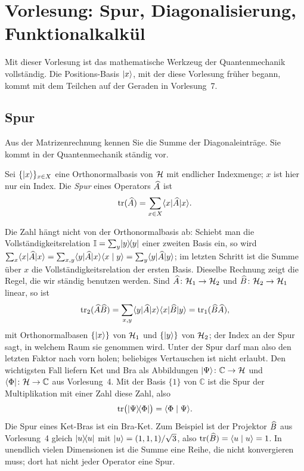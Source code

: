 
\section{Vorlesung: Spur, Diagonalisierung, Funktionalkalkül}

Mit dieser Vorlesung ist das mathematische Werkzeug der Quantenmechanik vollständig. Die Positions-Basis $\lvert x \rangle$, mit der diese Vorlesung früher begann, kommt mit dem Teilchen auf der Geraden in Vorlesung~7.

\subsection{Spur}
Aus der Matrizenrechnung kennen Sie die Summe der Diagonaleinträge. Sie kommt in der Quantenmechanik ständig vor.
\begin{definition}
	Sei $\{\lvert x \rangle\}_{x\in X}$ eine Orthonormalbasis von $\mathcal{H}$ mit endlicher Indexmenge; $x$ ist hier nur ein Index. Die \emph{Spur} eines Operators $\widehat{A}$ ist
	\begin{equation}
		\operatorname{tr}(\widehat{A}) = \sum_{x\in X} \langle x \rvert \widehat{A} \lvert x \rangle.
	\end{equation}
\end{definition}
Die Zahl hängt nicht von der Orthonormalbasis ab: Schiebt man die Vollständigkeitsrelation $\mathbb{I} = \sum_y \lvert y \rangle\!\langle y \rvert$ einer zweiten Basis ein, so wird $\sum_x \langle x \rvert \widehat{A} \lvert x \rangle = \sum_{x,y} \langle y \rvert \widehat{A} \lvert x \rangle\langle x \mid y \rangle = \sum_y \langle y \rvert \widehat{A} \lvert y \rangle$; im letzten Schritt ist die Summe über $x$ die Vollständigkeitsrelation der ersten Basis. Dieselbe Rechnung zeigt die Regel, die wir ständig benutzen werden. Sind $\widehat{A}\colon \mathcal{H}_1 \to \mathcal{H}_2$ und $\widehat{B}\colon \mathcal{H}_2 \to \mathcal{H}_1$ linear, so ist
\begin{equation}
	\operatorname{tr}_2(\widehat{A}\widehat{B}) = \sum_{x,y} \langle y \rvert \widehat{A} \lvert x \rangle\langle x \rvert \widehat{B} \lvert y \rangle = \operatorname{tr}_1(\widehat{B}\widehat{A}),
\end{equation}
mit Orthonormalbasen $\{\lvert x \rangle\}$ von $\mathcal{H}_1$ und $\{\lvert y \rangle\}$ von $\mathcal{H}_2$; der Index an der Spur sagt, in welchem Raum sie genommen wird. Unter der Spur darf man also den letzten Faktor nach vorn holen; beliebiges Vertauschen ist nicht erlaubt. Den wichtigsten Fall liefern Ket und Bra als Abbildungen $\lvert \Psi \rangle\colon\mathbb{C}\to\mathcal{H}$ und $\langle \Phi \rvert\colon\mathcal{H}\to\mathbb{C}$ aus Vorlesung~4. Mit der Basis $\{1\}$ von $\mathbb{C}$ ist die Spur der Multiplikation mit einer Zahl diese Zahl, also
\begin{equation}
	\operatorname{tr}\bigl(\lvert \Psi \rangle\!\langle \Phi \rvert\bigr) = \langle \Phi \mid \Psi \rangle.
\end{equation}
Die Spur eines Ket-Bras ist ein Bra-Ket. Zum Beispiel ist der Projektor $\widehat{B}$ aus Vorlesung~4 gleich $\lvert u \rangle\!\langle u \rvert$ mit $\lvert u \rangle = (1,1,1)/\sqrt{3}$, also $\operatorname{tr}(\widehat{B}) = \langle u \mid u \rangle = 1$. In unendlich vielen Dimensionen ist die Summe eine Reihe, die nicht konvergieren muss; dort hat nicht jeder Operator eine Spur.

